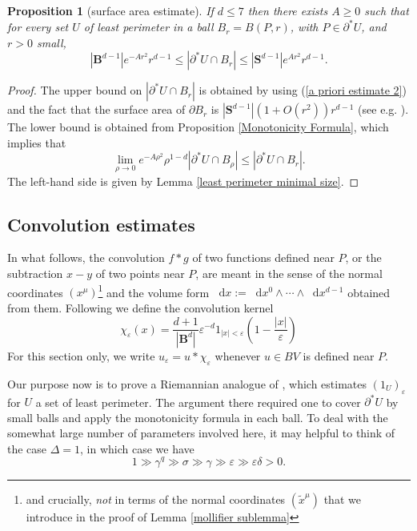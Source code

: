\documentclass[reqno,12pt,letterpaper]{amsart}
\newcommand{\Sph}{\mathbf S}
\newcommand{\Ball}{\mathbf{B}}
\newcommand*\dif{\mathop{}\!\mathrm{d}}
\newtheorem{proposition}[theorem]{Proposition}
\theoremstyle{definition}
\numberwithin{equation}{section}
\begin{document}
\begin{proposition}[surface area estimate]\label{doubling dimension}
If $d \leq 7$ then there exists $A \geq 0$ such that for every set $U$ of least perimeter in a ball $B_r = B(P, r)$, with $P \in \partial^* U$, and $r > 0$ small,
$$|\Ball^{d - 1}|e^{-Ar^2}r^{d - 1} \leq |\partial^*U \cap B_r| \leq |\Sph^{d - 1}|e^{Ar^2} r^{d - 1}.$$
\end{proposition}
\begin{proof}
The upper bound on $|\partial^* U \cap B_r|$ is obtained by using (\ref{a priori estimate 2}) and the fact that the surface area of $\partial B_r$ is $|\Sph^{d - 1}|(1 + O(r^2))r^{d - 1}$ (see e.g. \cite{gray1974volume}).
The lower bound is obtained from Proposition \ref{Monotonicity Formula}, which implies that
$$\lim_{\rho \to 0} e^{-A\rho^2} \rho^{1 - d} |\partial^* U \cap B_\rho| \leq |\partial^* U \cap B_r|.$$
The left-hand side is given by Lemma \ref{least perimeter minimal size}.
\end{proof}

\subsection{Convolution estimates}
In what follows, the convolution $f * g$ of two functions defined near $P$, or the subtraction $x - y$ of two points near $P$, are meant in the sense of the normal coordinates $(x^\mu)$\footnote{and crucially, \emph{not} in terms of the normal coordinates $(\tilde x^\mu)$ that we introduce in the proof of Lemma \ref{mollifier sublemma}} and the volume form $\dif x := \dif x^0 \wedge \cdots \wedge \dif x^{d - 1}$ obtained from them. Following \cite[Chapter 7]{Giusti77} we define the convolution kernel
$$\chi_\varepsilon(x) = \frac{d + 1}{|\Ball^d|} \varepsilon^{-d}1_{|x| < \varepsilon} \left(1 - \frac{|x|}{\varepsilon}\right)$$
For this section only, we write $u_\varepsilon = u * \chi_\varepsilon$ whenever $u \in BV$ is defined near $P$.

Our purpose now is to prove a Riemannian analogue of \cite[Theorem 7.3]{Giusti77}, which estimates $(1_U)_\varepsilon$ for $U$ a set of least perimeter.
The argument there required one to cover $\partial^* U$ by small balls and apply the monotonicity formula in each ball.
To deal with the somewhat large number of parameters involved here, it may helpful to think of the case $\Delta = 1$, in which case we have
$$1 \gg \gamma^q \gg \sigma \gg \gamma \gg \varepsilon \gg \varepsilon \delta > 0.$$
\end{document}
